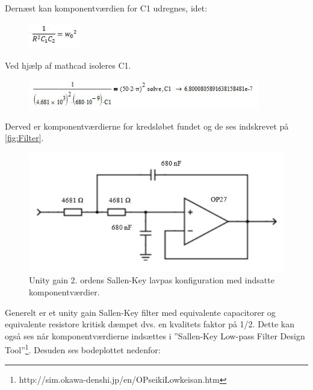 Dernæst kan komponentværdien for C1 udregnes, idet:

\begin{figure}[H]
	\centering
	\includegraphics[width=0.2\textwidth]{Figurer/Hardware/ligning6}
	\label{fig:lign6}
\end{figure}

Ved hjælp af mathcad isoleres C1. 

\begin{figure}[H]
	\centering
	\includegraphics[width=0.9\textwidth]{Figurer/Hardware/ligning7}
	\label{fig:lign7}
\end{figure}

Derved er komponentværdierne for kredsløbet fundet og de ses indskrevet på \ref{fig:Filter}. 

\begin{figure}[H]
	\centering
	\includegraphics[width=1\textwidth]{Figurer/Hardware/FilterDesignMedKomponentvaerdier}
	\caption{Unity gain 2. ordens Sallen-Key lavpas konfiguration med indsatte komponentværdier.}
	\label{fig:Filter_K}
\end{figure}

Generelt er et unity gain Sallen-Key filter med equivalente capacitorer og equivalente resistore kritisk dæmpet dvs. en kvalitets faktor på 1/2. Dette kan også ses når komponentværdierne indsættes i ”Sallen-Key Low-pass Filter Design Tool”\footnote{http://sim.okawa-denshi.jp/en/OPseikiLowkeisan.htm}. Desuden ses bodeplottet nedenfor:

